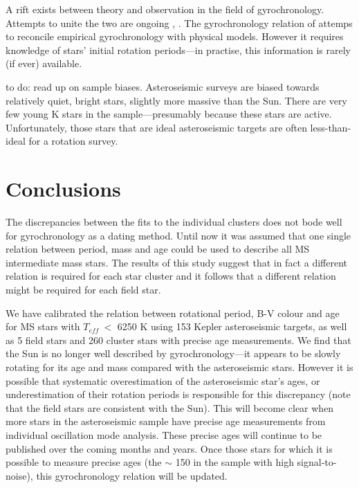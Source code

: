 \documentclass[12pt,preprint]{aastex}
\newcommand{\teff}{$T_{eff}~$}
\begin{document}
A rift exists between theory and observation in the field of gyrochronology.
Attempts to unite the two are ongoing \citep{Barnes2011}, \citep{vanSaders2013}.
The gyrochronology relation of \citet{Barnes2010} attemps to reconcile empirical gyrochronology with physical models.
However it requires knowledge of stars' initial rotation periods---in practise, this information is rarely (if ever) available.

{\color{red} to do: read up on sample biases.}
Asteroseismic surveys are biased towards relatively quiet, bright stars, slightly more massive than the Sun.
There are very few young K stars in the \citet{Chaplin2013} sample---presumably because these stars are active.
Unfortunately, those stars that are ideal asteroseismic targets are often less-than-ideal for a rotation survey.

\section{Conclusions}
\label{sec:conclusions}

The discrepancies between the fits to the individual clusters does not bode well for gyrochronology as a dating method.
Until now it was assumed that one single relation between period, mass and age could be used to describe all MS intermediate mass stars.
The results of this study suggest that in fact a different relation is required for each star cluster and it follows that a different relation might be required for each field star.

We have calibrated the relation between rotational period, B-V colour and age for MS stars with \teff $<$ 6250 K using 153 Kepler asteroseismic targets, as well as 5 field stars and 260 cluster stars with precise age measurements.
We find that the Sun is no longer well described by gyrochronology---it appears to be slowly rotating for its age and mass compared with the asteroseismic stars.
However it is possible that systematic overestimation of the asteroseismic star's ages, or underestimation of their rotation periods is responsible for this discrepancy (note that the field stars are consistent with the Sun).
This will become clear when more stars in the asteroseismic sample have precise age measurements from individual oscillation mode analysis.
These precise ages will continue to be published over the coming months and years.
Once those stars for which it is possible to measure precise ages (the $\sim$ 150 in the \citet{Chaplin2013} sample with high signal-to-noise), this gyrochronology relation will be updated.
\end{document}
